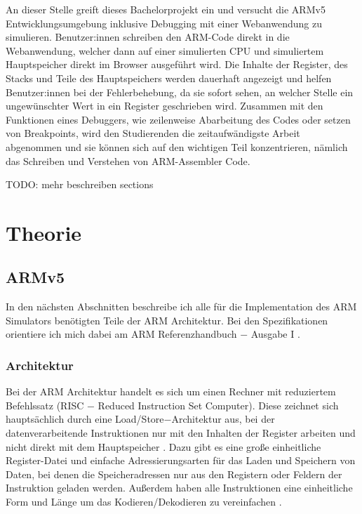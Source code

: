 \documentclass[a4paper, 11pt, onecolumn]{article}
\begin{document}
An dieser Stelle greift dieses Bachelorprojekt ein und versucht die ARMv5 Entwicklungsumgebung inklusive Debugging mit einer Webanwendung zu simulieren. Benutzer:innen schreiben den ARM-Code direkt in die Webanwendung, welcher dann auf einer simulierten CPU und simuliertem Hauptspeicher direkt im Browser ausgeführt wird. Die Inhalte der Register, des Stacks und Teile des Hauptspeichers werden dauerhaft angezeigt und helfen Benutzer:innen bei der Fehlerbehebung, da sie sofort sehen, an welcher Stelle ein ungewünschter Wert in ein Register geschrieben wird. Zusammen mit den Funktionen eines Debuggers, wie zeilenweise Abarbeitung des Codes oder setzen von Breakpoints, wird den Studierenden die zeitaufwändigste Arbeit abgenommen und sie können sich auf den wichtigen Teil konzentrieren, nämlich das Schreiben und Verstehen von ARM-Assembler Code.

TODO: mehr beschreiben sections

\newpage

\section{Theorie}

\subsection{ARMv5}\label{sec:armv5}

In den nächsten Abschnitten beschreibe ich alle für die Implementation des ARM Simulators benötigten Teile der ARM Architektur. Bei den Spezifikationen orientiere ich mich dabei am ARM Referenzhandbuch $-$ Ausgabe I \cite{arm:2005}.

\subsubsection{Architektur}\label{sec:architecture}

Bei der ARM Architektur handelt es sich um einen Rechner mit reduziertem Befehlssatz (RISC $-$ Reduced Instruction Set Computer). Diese zeichnet sich hauptsächlich durch eine Load/Store$-$Architektur aus, bei der datenverarbeitende Instruktionen nur mit den Inhalten der Register arbeiten und nicht direkt mit dem Hauptspeicher \cite{risc}. Dazu gibt es eine große einheitliche Register-Datei und einfache Adressierungsarten für das Laden und Speichern von Daten, bei denen die Speicheradressen nur aus den Registern oder Feldern der Instruktion geladen werden. Außerdem haben alle Instruktionen eine einheitliche Form und Länge um das Kodieren/Dekodieren zu vereinfachen \cite{arm:2005}\cite{risc}.
\end{document}
